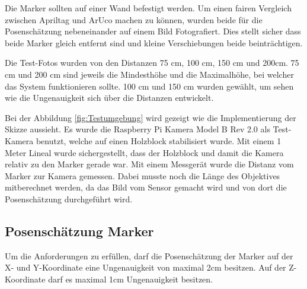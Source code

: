 Die Marker sollten auf einer Wand befestigt werden. 
Um einen fairen Vergleich zwischen Apriltag und ArUco machen zu können, wurden beide für die Posenschätzung nebeneinander auf einem Bild Fotografiert.
Dies stellt sicher dass beide Marker gleich entfernt sind und kleine Verschiebungen beide beinträchtigen.

Die Test-Fotos wurden von den Distanzen 75 cm, 100 cm, 150 cm und 200cm.
75 cm und 200 cm sind jeweils die Mindesthöhe und die Maximalhöhe, bei welcher das System funktionieren sollte.
100 cm und 150 cm wurden gewählt, um sehen wie die Ungenauigkeit sich über die Distanzen entwickelt.

Bei der Abbildung \ref{fig:Testumgebung} wird gezeigt wie die Implementierung der Skizze aussieht. 
Es wurde die Raspberry Pi Kamera Model B Rev 2.0 als Test-Kamera benutzt, welche auf einen Holzblock stabilisiert wurde.
Mit einem 1 Meter Lineal wurde sichergestellt, dass der Holzblock und damit die Kamera relativ zu den Marker gerade war.
Mit einem Messgerät wurde die Distanz vom Marker zur Kamera gemessen. 
Dabei musste noch die Länge des Objektives mitberechnet werden, da das Bild vom Sensor gemacht wird und von dort die Posenschätzung durchgeführt wird.

\subsection{Posenschätzung Marker}
\label{sec:EvaluationPosen}

Um die Anforderungen zu erfüllen, darf die Posenschätzung der Marker auf der X- und Y-Koordinate eine Ungenauigkeit von maximal 2cm besitzen. 
Auf der Z-Koordinate darf es maximal 1cm Ungenauigkeit besitzen.

